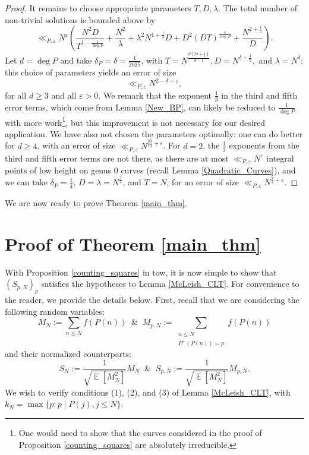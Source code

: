 \documentclass[11pts]{amsart}
\numberwithin{equation}{section}
\DeclareMathOperator{\E}{\mathbb{E}}
\begin{document}
\begin{proof}
It remains to choose appropriate parameters $T,D,\lambda$. The total number of non-trivial solutions is bounded above by
\[
\ll_{P,\varepsilon}
    N^{\varepsilon}
        \left(\frac{N^2D}{T^{1-\frac{1}{\deg P}}}
                +\frac{N^2}{\lambda}
                +\lambda^2N^{1+\frac{1}{3}}D    
                +
                D^2(DT)^{\frac{4}{\deg P}}
                +
                \frac{N^{2+\frac{1}{3}}}{D}
                \right).
\]
Let $d = \deg P$ and take $\delta_P =\delta = \frac{1}{2025}$, with $T=N^{\frac{d(2\delta+\frac{1}{3})}{d-1}}, D=N^{\delta+\frac{1}{3}},$ and $\lambda = N^{\delta}$; this choice of parameters yields an error of size
\[
\ll_{P,\varepsilon}
N^{2-\delta+\varepsilon},
\]
for all $d\geq 3$ and all $\varepsilon>0$. We remark that the exponent $\frac{1}{3}$ in the third and fifth error terms, which come from Lemma \ref{New_BP}, can likely be reduced to $\frac{1}{\deg P}$ with more work\footnote{One would need to show that the curves considered in the proof of Proposition \ref{counting_squares} are absolutely irreducible.}, but this improvement is not necessary for our desired application. We have also not chosen the parameters optimally: one can do better for $d\geq 4$, with an error of size $\ll_{P,\varepsilon}
N^{\frac{23}{12}+\varepsilon}$. For $d=2$, the $\frac{1}{3}$ exponents from the third and fifth error terms are not there, as there are at most $\ll_{P,\varepsilon}N^\varepsilon$ integral points of low height on genus $0$ curves (recall Lemma \ref{Quadratic_Curves}), and we can take $\delta_P = \frac{1}{4}$, $D=\lambda=N^{\frac{1}{4}}$, and $T=N$, for an error of size $\ll_{P,\varepsilon} N^{\frac{7}{4}+\varepsilon}$.
\end{proof}

We are now ready to prove Theorem \ref{main_thm}.


    









\section{Proof of Theorem \ref{main_thm}}
\label{Section_Proof}

With Proposition \ref{counting_squares} in tow, it is now simple to show that $(S_{p,N})_p$ satisfies the hypotheses to Lemma \ref{McLeish_CLT}. For convenience to the reader, we provide the details below. First, recall that we are considering the following random variables:
\[
M_N:=\sum_{n\leq N}f(P(n))\;\;\&\;\;M_{p,N}:=\sum_{\substack{{n\leq N}\\{P^+(P(n))=p}}}f(P(n))
\]
and their normalized counterparts:
\[
S_N:=\frac{1}{\sqrt{\E\left[M_N^2\right]}}M_N\;\;\&\;\;S_{p,N}:=\frac{1}{\sqrt{\E\left[M_N^2\right]}}M_{p,N}.
\]
We wish to verify conditions (1), (2), and (3) of Lemma \ref{McLeish_CLT}, with $k_N=\max\{p : p \mid P(j), j \leq N\}$.
\end{document}
